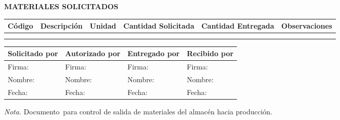 \documentclass[
  stu,
  floatsintext,
  longtable,
  a4paper,
  nolmodern,
  notxfonts,
  notimes,
  12pt,
  colorlinks=true,linkcolor=blue,citecolor=blue,urlcolor=blue]{apa7}
\newcounter{none} %
\begin{document}
\textbf{MATERIALES SOLICITADOS}

{\def\LTcaptype{none} %
\begin{longtable}[]{@{}
  >{\centering\arraybackslash}p{}
  >{\raggedright\arraybackslash}p{}
  >{\centering\arraybackslash}p{}
  >{\centering\arraybackslash}p{}
  >{\centering\arraybackslash}p{}
  >{\raggedright\arraybackslash}p{}@{}}
\toprule\noalign{}
\begin{minipage}[b]{\linewidth}\centering
Código
\end{minipage} & \begin{minipage}[b]{\linewidth}\raggedright
Descripción
\end{minipage} & \begin{minipage}[b]{\linewidth}\centering
Unidad
\end{minipage} & \begin{minipage}[b]{\linewidth}\centering
Cantidad Solicitada
\end{minipage} & \begin{minipage}[b]{\linewidth}\centering
Cantidad Entregada
\end{minipage} & \begin{minipage}[b]{\linewidth}\raggedright
Observaciones
\end{minipage} \\
\midrule\noalign{}
\endhead
\bottomrule\noalign{}
\endlastfoot
& & & & & \\
& & & & & \\
\end{longtable}
}

\begin{table}

{\caption{{Formulario de Requisición de
Materiales}{\label{tbl-requisicion}}}}

{\def\LTcaptype{none} %
\begin{longtable}[]{@{}llll@{}}
\toprule\noalign{}
Solicitado por & Autorizado por & Entregado por & Recibido por \\
\midrule\noalign{}
\endhead
\bottomrule\noalign{}
\endlastfoot
Firma: & Firma: & Firma: & Firma: \\
Nombre: & Nombre: & Nombre: & Nombre: \\
Fecha: & Fecha: & Fecha: & Fecha: \\
\end{longtable}
}

\noindent \emph{Nota.} Documento~para control de salida de materiales
del almacén hacia producción.

\end{table}
\end{document}

